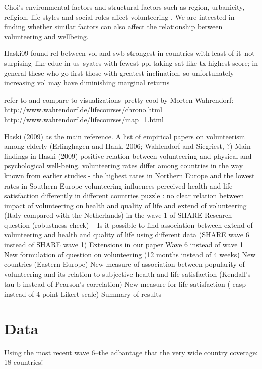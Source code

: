 \documentclass[10pt, letterpaper]{article}
\begin{document}
\begin{spacing}{1.4}
Choi's environmental factors and structural factors such as region, urbanicity,
religion, life styles and social roles affect volunteering \citep[][cited in]{hank09}.
 We are inteested in finding whether similar factors can also affect the
 relationship between volunteering and wellbeing. 

Haski09 found rel between vol and swb strongest in countries with least of
it--not surpising--like educ in us--syates with fewest ppl taking sat like tx
highest score; in general these who go first those with greatest inclination, so
unfortunately increasing vol may have diminishing marginal returns

refer to and compare to 
visualizations--pretty cool by Morten Wahrendorf:
\url{http://www.wahrendorf.de/lifecourses/chrono.html}
\url{http://www.wahrendorf.de/lifecourses/map_1.html}


Haski (2009) as the main reference. A list of empirical papers on volunteerism among elderly (Erlinghagen and Hank, 2006; Wahlendorf and Siegriest, ?)
Main findings in Haski (2009)
positive relation between volunteering and physical and psychological well-being.
volunteering rates differ among countries  in the way known from earlier studies - the highest rates in Northern Europe and the lowest rates in Southern Europe
volunteering influences perceived health and life satisfaction  differently in different countries
puzzle : no clear relation between impact of volunteering on health and quality of life and extend of volunteering (Italy compared with the Netherlands) in the wave 1 of SHARE
Research question (robustness check) -- Is it possible to find association between extend of volunteering and health and quality of life using different data (SHARE wave 6 instead of SHARE wave 1) 
 Extensions in our paper
Wave 6 instead of wave 1
New formulation of question on volunteering (12 months instead of 4 weeks)
New countries (Eastern Europe)
New measure of association between popularity of volunteering and its relation to subjective health and life satisfaction (Kendall's tau-b instead of Pearson's correlation)
New measure for life satisfaction ( casp instead of 4 point Likert scale)
Summary of results 



\section{Data}

Using the most recent wave 6--the adbantage that the very wide country coverage:
18 countries!


\end{spacing}
\end{document}
